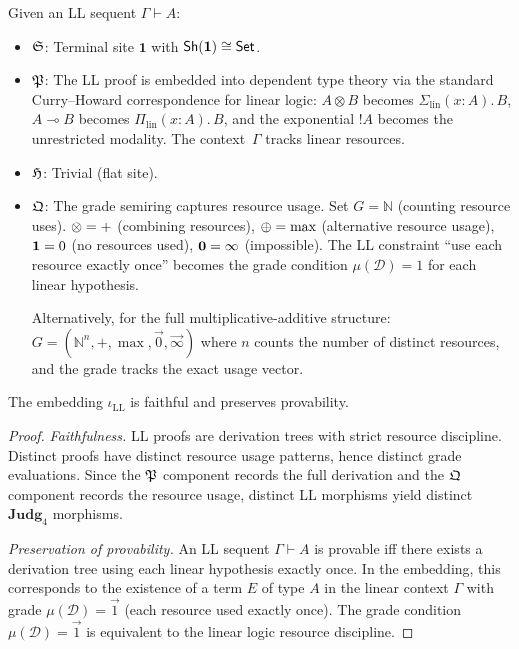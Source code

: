 \begin{construction}
\label{con:linear-embed}
Given an LL sequent $\Gamma \vdash A$:
\begin{itemize}[nosep]
\item $\mathfrak{S}$: Terminal site $\mathbf{1}$ with $\mathsf{Sh}(\mathbf{1})
  \cong \mathsf{Set}$.

\item $\mathfrak{P}$: The LL proof is embedded into dependent type theory
  via the standard Curry--Howard correspondence for linear logic:
  $A \otimes B$ becomes $\Sigma_{\mathrm{lin}}(x:A).\,B$,
  $A \multimap B$ becomes $\Pi_{\mathrm{lin}}(x:A).\,B$,
  and the exponential $!A$ becomes the unrestricted modality.
  The context~$\Gamma$ tracks linear resources.

\item $\mathfrak{H}$: Trivial (flat site).

\item $\mathfrak{Q}$: The grade semiring captures resource usage.
  Set $G = \mathbb{N}$ (counting resource uses).
  $\otimes = +$ (combining resources), $\oplus = \max$ (alternative
  resource usage), $\mathbf{1} = 0$ (no resources used),
  $\mathbf{0} = \infty$ (impossible).
  The LL constraint ``use each resource exactly once'' becomes
  the grade condition $\mu(\mathcal{D}) = 1$ for each linear
  hypothesis.

  Alternatively, for the full multiplicative-additive structure:
  $G = (\mathbb{N}^n, +, \max, \vec{0}, \vec{\infty})$ where $n$
  counts the number of distinct resources, and the grade tracks
  the exact usage vector.
\end{itemize}
\end{construction}

\begin{theorem}
\label{thm:linear}
The embedding $\iota_{\mathrm{LL}}$ is faithful and preserves
provability.
\end{theorem}

\begin{proof}
\emph{Faithfulness.}  LL proofs are derivation trees with strict
resource discipline.  Distinct proofs have distinct resource usage
patterns, hence distinct grade evaluations.  Since the $\mathfrak{P}$
component records the full derivation and the $\mathfrak{Q}$ component
records the resource usage, distinct LL morphisms yield distinct
$\mathbf{Judg}_4$ morphisms.

\emph{Preservation of provability.}  An LL sequent
$\Gamma \vdash A$ is provable iff there exists a derivation tree
using each linear hypothesis exactly once.  In the embedding, this
corresponds to the existence of a term $E$ of type $A$ in the
linear context $\Gamma$ with grade $\mu(\mathcal{D}) = \vec{1}$
(each resource used exactly once).  The grade condition
$\mu(\mathcal{D}) = \vec{1}$ is equivalent to the linear logic
resource discipline.
\end{proof}

